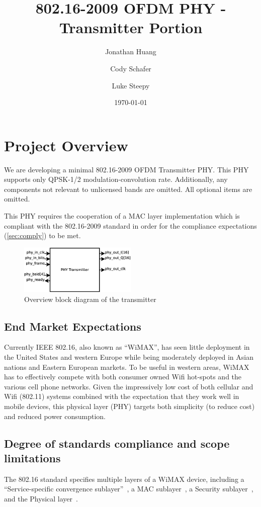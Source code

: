 \documentclass[dvips,10pt,twocolumn]{article}
\title{802.16-2009 OFDM PHY - Transmitter Portion}
\author{Jonathan Huang \and Cody Schafer \and Luke Steepy}
\date{\today}
\begin{document}
\maketitle

\section{Project Overview}
We are developing a minimal 802.16-2009 OFDM Transmitter PHY.  This PHY
supports only QPSK-1/2 modulation-convolution rate. Additionally, any
components not relevant to unlicensed bands are omitted.  All optional items
are omitted.

This PHY requires the cooperation of a MAC layer implementation which is
compliant with the 802.16-2009 standard in order for the compliance
expectations (\autoref{sec:comply}) to be met.

\begin{figure}
\includegraphics[width=0.5\textwidth]{t_block.eps}
\caption{Overview block diagram of the transmitter}
\end{figure}


	\subsection{End Market Expectations}
	Currently IEEE 802.16, also known as ``WiMAX'', has seen little
	deployment in the United States and western Europe while being
	moderately deployed in Asian nations and Eastern European markets.
	To be useful in western areas, WiMAX has to effectively compete
	with both consumer owned Wifi hot-spots and the various cell phone
	networks. Given the impressively low cost of both cellular and Wifi
	(802.11) systems combined with the expectation that they work well
	in mobile devices, this physical layer (PHY) targets both
	simplicity (to reduce cost) and reduced power consumption.

	\subsection{Degree of standards compliance and scope limitations}
	\label{sec:comply}
	The 802.16 standard specifies multiple layers of a WiMAX device,
	including a ``Service-specific convergence
	sublayer''~\cite[section 5]{IEEE:802.16}, a MAC
	sublayer~\cite[section 6]{IEEE:802.16}, a Security
	sublayer~\cite[section 7]{IEEE:802.16}, and the Physical
	layer~\cite[section 8]{IEEE:802.16}. 
	
\end{document}
